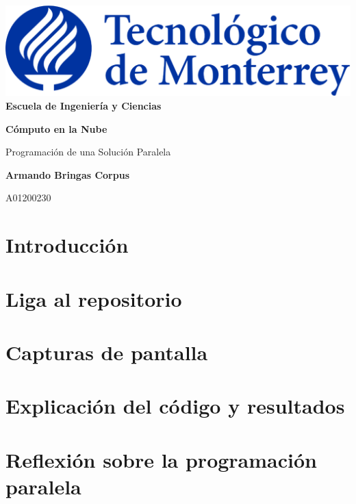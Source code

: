 \documentclass[12pt,a4paper]{article}
\begin{document}
    \begin{titlepage}
        \begin{center}
            \includegraphics[scale=1]{reporte/figuras/Logo_Tec.png}\\
            \vspace{.5cm}
            \bf{\large Escuela de Ingeniería y Ciencias}
        \end{center}
        
        \vspace{5cm}
        \centering
        \textbf{\Huge Cómputo en la Nube}
        \vspace{0.5cm}
        
        {\Large Programación de una Solución Paralela}

        \vspace{5cm}
        
        \textbf{\LARGE Armando Bringas Corpus}
        
        \vspace{0.5cm}
        
        {\large A01200230}
        
        \vfill
        
    \end{titlepage}

    \section{Introducción}

    \section{Liga al repositorio}
    

    \section{Capturas de pantalla}

    \section{Explicación del código y resultados}

    \section{Reflexión sobre la programación paralela}
    
\end{document}
